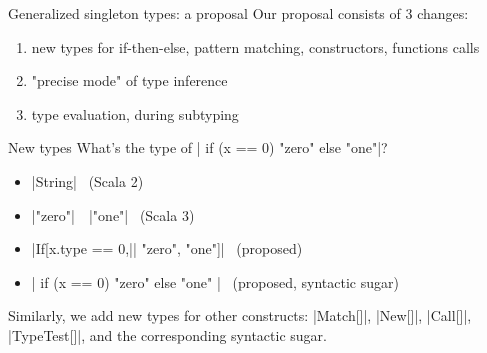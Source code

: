 \documentclass[10pt]{beamer}
\newenvironment{slide}[2][]
  {\begin{frame}[fragile,environment=slide,#1]{#2}}
  {\end{frame}}
\begin{document}
\begin{slide}{Generalized singleton types: a proposal}
Our proposal consists of 3 changes:
\begin{enumerate}
  \item new types for if-then-else, pattern matching, constructors, functions calls
  \item "precise mode" of type inference
  \item type evaluation, during subtyping
\end{enumerate}
\end{slide}

\begin{slide}{New types}
What's the type of | if (x == 0) "zero" else "one"|?
\begin{itemize}
  \pause\item |String| ~(Scala 2)
  \pause\item |"zero"|~{\footnotesize\texttt\textbar}~|"one"| ~(Scala 3)
  \pause\item |If[x.type == 0,|| "zero", "one"]| ~(proposed)
  \pause\item |{ if (x == 0) "zero" else "one" }| ~(proposed, syntactic sugar)
\end{itemize}
\pause
Similarly, we add new types for other constructs: |Match[]|, |New[]|, |Call[]|, |TypeTest[]|, and the corresponding syntactic sugar.
\end{slide}
\end{document}
